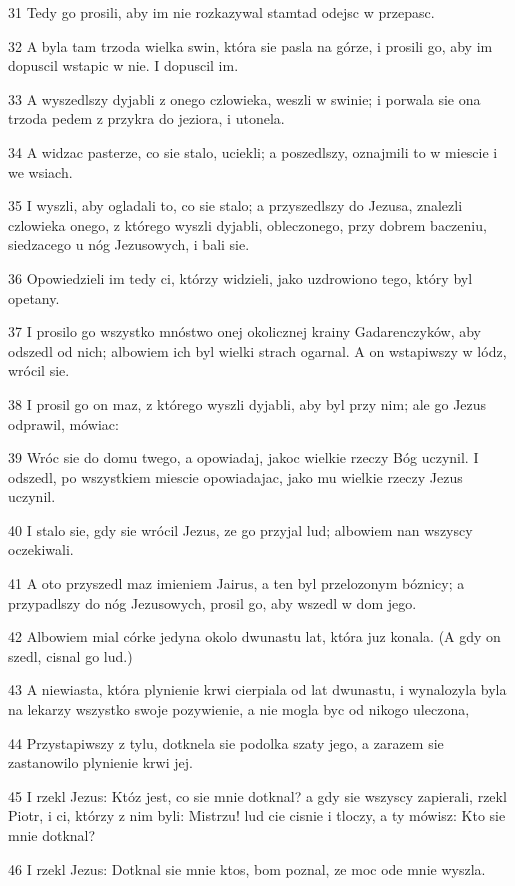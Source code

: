 \par 31 Tedy go prosili, aby im nie rozkazywal stamtad odejsc w przepasc.
\par 32 A byla tam trzoda wielka swin, która sie pasla na górze, i prosili go, aby im dopuscil wstapic w nie. I dopuscil im.
\par 33 A wyszedlszy dyjabli z onego czlowieka, weszli w swinie; i porwala sie ona trzoda pedem z przykra do jeziora, i utonela.
\par 34 A widzac pasterze, co sie stalo, uciekli; a poszedlszy, oznajmili to w miescie i we wsiach.
\par 35 I wyszli, aby ogladali to, co sie stalo; a przyszedlszy do Jezusa, znalezli czlowieka onego, z którego wyszli dyjabli, obleczonego, przy dobrem baczeniu, siedzacego u nóg Jezusowych, i bali sie.
\par 36 Opowiedzieli im tedy ci, którzy widzieli, jako uzdrowiono tego, który byl opetany.
\par 37 I prosilo go wszystko mnóstwo onej okolicznej krainy Gadarenczyków, aby odszedl od nich; albowiem ich byl wielki strach ogarnal. A on wstapiwszy w lódz, wrócil sie.
\par 38 I prosil go on maz, z którego wyszli dyjabli, aby byl przy nim; ale go Jezus odprawil, mówiac:
\par 39 Wróc sie do domu twego, a opowiadaj, jakoc wielkie rzeczy Bóg uczynil. I odszedl, po wszystkiem miescie opowiadajac, jako mu wielkie rzeczy Jezus uczynil.
\par 40 I stalo sie, gdy sie wrócil Jezus, ze go przyjal lud; albowiem nan wszyscy oczekiwali.
\par 41 A oto przyszedl maz imieniem Jairus, a ten byl przelozonym bóznicy; a przypadlszy do nóg Jezusowych, prosil go, aby wszedl w dom jego.
\par 42 Albowiem mial córke jedyna okolo dwunastu lat, która juz konala. (A gdy on szedl, cisnal go lud.)
\par 43 A niewiasta, która plynienie krwi cierpiala od lat dwunastu, i wynalozyla byla na lekarzy wszystko swoje pozywienie, a nie mogla byc od nikogo uleczona,
\par 44 Przystapiwszy z tylu, dotknela sie podolka szaty jego, a zarazem sie zastanowilo plynienie krwi jej.
\par 45 I rzekl Jezus: Któz jest, co sie mnie dotknal? a gdy sie wszyscy zapierali, rzekl Piotr, i ci, którzy z nim byli: Mistrzu! lud cie cisnie i tloczy, a ty mówisz: Kto sie mnie dotknal?
\par 46 I rzekl Jezus: Dotknal sie mnie ktos, bom poznal, ze moc ode mnie wyszla.
